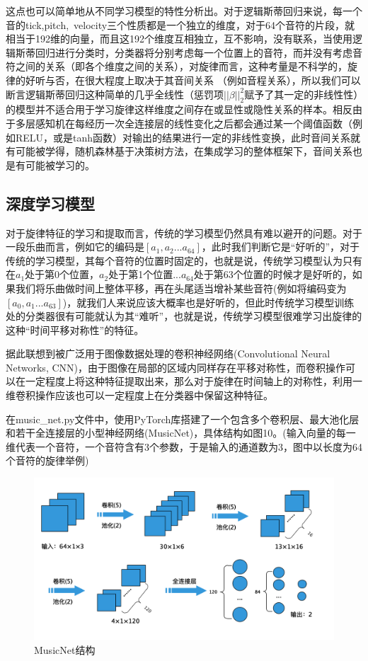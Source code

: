 \documentclass[UTF8,a4paper,10pt]{ctexart}
\begin{document}
    这点也可以简单地从不同学习模型的特性分析出。对于逻辑斯蒂回归来说，每一个音的tick,pitch,\  velocity三个性质都是一个独立的维度，对于64个音符的片段，就相当于192维的向量，而且这192个维度互相独立，互不影响，没有联系，当使用逻辑斯蒂回归进行分类时，分类器将分别考虑每一个位置上的音符，而并没有考虑音符之间的关系（即各个维度之间的关系），对旋律而言，这种考量是不科学的，旋律的好听与否，在很大程度上取决于其音间关系 （例如音程关系），所以我们可以断言逻辑斯蒂回归这种简单的几乎全线性（惩罚项$||\beta||_2^2$赋予了其一定的非线性性）的模型并不适合用于学习旋律这样维度之间存在或显性或隐性关系的样本。相反由于多层感知机在每经历一次全连接层的线性变化之后都会通过某一个阈值函数（例如RELU，或是tanh函数）对输出的结果进行一定的非线性变换，此时音间关系就有可能被学得，随机森林基于决策树方法，在集成学习的整体框架下，音间关系也是有可能被学习的。

    \subsection{深度学习模型}

    对于旋律特征的学习和提取而言，传统的学习模型仍然具有难以避开的问题。对于一段乐曲而言，例如它的编码是$[a_1,a_2...a_{64}]$，此时我们判断它是“好听的”，对于传统的学习模型，其每个音符的位置时固定的，也就是说，传统学习模型认为只有在$a_1$处于第0个位置，$a_2$处于第1个位置...$a_{64}$处于第63个位置的时候才是好听的，如果我们将乐曲做时间上整体平移，再在头尾适当增补某些音符(例如将编码变为$[a_0,a_1...a_{63}]$)，就我们人来说应该大概率也是好听的，但此时传统学习模型训练处的分类器很有可能就认为其“难听”，也就是说，传统学习模型很难学习出旋律的这种“时间平移对称性”的特征。

    据此联想到被广泛用于图像数据处理的卷积神经网络(Convolutional Neural Networks, CNN)，由于图像在局部的区域内同样存在平移对称性，而卷积操作可以在一定程度上将这种特征提取出来，那么对于旋律在时间轴上的对称性，利用一维卷积操作应该也可以一定程度上在分类器中保留这种特征。

    在music\_net.py文件中，使用PyTorch库搭建了一个包含多个卷积层、最大池化层和若干全连接层的小型神经网络(MusicNet)，具体结构如图10。(输入向量的每一维代表一个音符，一个音符含有3个参数，于是输入的通道数为3，图中以长度为64个音符的旋律举例)
    \begin{figure}[H]
    \begin{center}
        \includegraphics[width=0.7\columnwidth]{CNN_net_structure.png}
        \caption{MusicNet结构}
    \end{center}
    \end{figure}
\end{document}
